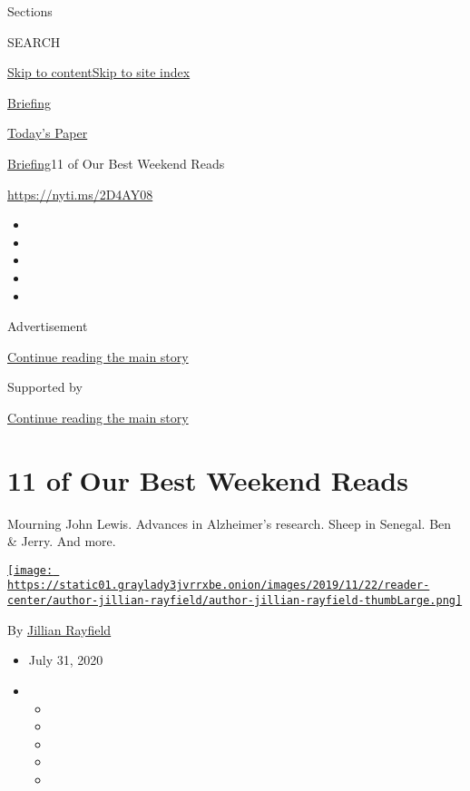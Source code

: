 Sections

SEARCH

\protect\hyperlink{site-content}{Skip to
content}\protect\hyperlink{site-index}{Skip to site index}

\href{https://www.nytimes3xbfgragh.onion/interactive/2018/briefing/global-morning-briefing-newsletter-signup.html}{Briefing}

\href{https://myaccount.nytimes3xbfgragh.onion/auth/login?response_type=cookie\&client_id=vi}{}

\href{https://www.nytimes3xbfgragh.onion/section/todayspaper}{Today's
Paper}

\href{/interactive/2018/briefing/global-morning-briefing-newsletter-signup.html}{Briefing}\textbar{}11
of Our Best Weekend Reads

\url{https://nyti.ms/2D4AY08}

\begin{itemize}
\item
\item
\item
\item
\item
\end{itemize}

Advertisement

\protect\hyperlink{after-top}{Continue reading the main story}

Supported by

\protect\hyperlink{after-sponsor}{Continue reading the main story}

\hypertarget{11-of-our-best-weekend-reads}{%
\section{11 of Our Best Weekend
Reads}\label{11-of-our-best-weekend-reads}}

Mourning John Lewis. Advances in Alzheimer's research. Sheep in Senegal.
Ben \& Jerry. And more.

\href{https://www.nytimes3xbfgragh.onion/by/jillian-rayfield}{\texttt{[image: https://static01.graylady3jvrrxbe.onion/images/2019/11/22/reader-center/author-jillian-rayfield/author-jillian-rayfield-thumbLarge.png]}}

By \href{https://www.nytimes3xbfgragh.onion/by/jillian-rayfield}{Jillian
Rayfield}

\begin{itemize}
\item
  July 31, 2020
\item
  \begin{itemize}
  \item
  \item
  \item
  \item
  \item
  \end{itemize}
\end{itemize}

